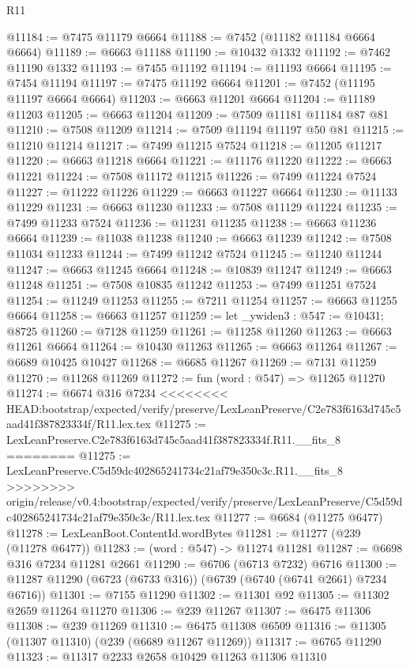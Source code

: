 \begin{lexlean}{R11}
\begin{coremodule}
{{{{{{{{{{{{{{{{{{{{{{{{{{{{{{{{{{{{{{{{{{{{{{{{{{{{{{{{{{{{{{{{{{{{{{{{{{{{{{{{{{@11184 := @7475 @11179 @6664
@11188 := @7452 (@11182 @11184 @6664 @6664)
@11189 := @6663 @11188
@11190 := @10432 @1332
@11192 := @7462 @11190 @1332
@11193 := @7455 @11192
@11194 := @11193 @6664
@11195 := @7454 @11194
@11197 := @7475 @11192 @6664
@11201 := @7452 (@11195 @11197 @6664 @6664)
@11203 := @6663 @11201 @6664
@11204 := @11189 @11203
@11205 := @6663 @11204
@11209 := @7509 @11181 @11184 @87 @81
@11210 := @7508 @11209
@11214 := @7509 @11194 @11197 @50 @81
@11215 := @11210 @11214
@11217 := @7499 @11215 @7524
@11218 := @11205 @11217
@11220 := @6663 @11218 @6664
@11221 := @11176 @11220
@11222 := @6663 @11221
@11224 := @7508 @11172 @11215
@11226 := @7499 @11224 @7524
@11227 := @11222 @11226
@11229 := @6663 @11227 @6664
@11230 := @11133 @11229
@11231 := @6663 @11230
@11233 := @7508 @11129 @11224
@11235 := @7499 @11233 @7524
@11236 := @11231 @11235
@11238 := @6663 @11236 @6664
@11239 := @11038 @11238
@11240 := @6663 @11239
@11242 := @7508 @11034 @11233
@11244 := @7499 @11242 @7524
@11245 := @11240 @11244
@11247 := @6663 @11245 @6664
@11248 := @10839 @11247
@11249 := @6663 @11248
@11251 := @7508 @10835 @11242
@11253 := @7499 @11251 @7524
@11254 := @11249 @11253
@11255 := @7211 @11254
@11257 := @6663 @11255 @6664
@11258 := @6663 @11257
@11259 := let _ywiden3 : @547 := @10431; @8725
@11260 := @7128 @11259
@11261 := @11258 @11260
@11263 := @6663 @11261 @6664
@11264 := @10430 @11263
@11265 := @6663 @11264
@11267 := @6689 @10425 @10427
@11268 := @6685 @11267
@11269 := @7131 @11259
@11270 := @11268 @11269
@11272 := fun (word : @547) => @11265 @11270
@11274 := @6674 @316 @7234
<<<<<<<< HEAD:bootstrap/expected/verify/preserve/LexLeanPreserve/C2e783f6163d745c5aad41f387823334f/R11.lex.tex
@11275 := LexLeanPreserve.C2e783f6163d745c5aad41f387823334f.R11.__fits_8
========
@11275 := LexLeanPreserve.C5d59dc402865241734c21af79e350c3c.R11.__fits_8
>>>>>>>> origin/release/v0.4:bootstrap/expected/verify/preserve/LexLeanPreserve/C5d59dc402865241734c21af79e350c3c/R11.lex.tex
@11277 := @6684 (@11275 @6477)
@11278 := LexLeanBoot.ContentId.wordBytes
@11281 := @11277 (@239 (@11278 @6477))
@11283 := (word : @547) -> @11274 @11281
@11287 := @6698 @316 @7234 @11281 @2661
@11290 := @6706 (@6713 @7232) @6716
@11300 := @11287 @11290 (@6723 (@6733 @316)) (@6739 (@6740 (@6741 @2661) @7234 @6716))
@11301 := @7155 @11290
@11302 := @11301 @92
@11305 := @11302 @2659 @11264 @11270
@11306 := @239 @11267
@11307 := @6475 @11306
@11308 := @239 @11269
@11310 := @6475 @11308 @6509
@11316 := @11305 (@11307 @11310) (@239 (@6689 @11267 @11269))
@11317 := @6765 @11290
@11323 := @11317 @2233 @2658 @10429 @11263 @11306 @11310
}}}}}}}}}}}}}}}}}}}}}}}}}}}}}}}}}}}}}}}}}}}}}}}}}}}}}}}}}}}}}}}}}}}}}}}}}}}}}}}}}}
\end{coremodule}
\end{lexlean}
